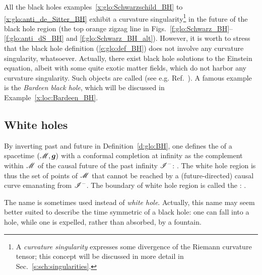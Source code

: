 \begin{remark}
All the black holes examples~\ref{x:glo:Schwarzschild_BH} to \ref{x:glo:anti_de_Sitter_BH} exhibit a curvature singularity\footnote{A \emph{curvature singularity} expresses some divergence of the Riemann curvature tensor; this concept will be discussed in more detail in Sec.~\ref{s:sch:singularities}.} in the future of the black hole region (the top orange zigzag line in
Figs.~\ref{f:glo:Schwarz_BH}--\ref{f:glo:anti_dS_BH} and \ref{f:glo:Schwarz_BH_alt}).
However, it is worth to stress that the black hole definition (\ref{e:glo:def_BH}) does not involve
any curvature singularity, whatsoever. Actually, there exist black hole solutions to the Einstein equation, albeit with some quite exotic matter fields, which do not harbor any curvature singularity.
Such objects are called  (see e.g. Ref.~\cite{Bambi23}).
A famous example is the \emph{Bardeen black hole}, which will be discussed in
Example~\ref{x:loc:Bardeen_BH}.
\end{remark}

\subsection{White holes}

By inverting past and future in Definition~\ref{d:glo:BH}, one defines
the  of a
spacetime $(\mathscr{M},\bm{g})$ with a conformal completion at infinity as the
complement within $\mathscr{M}$ of the causal future of the past infinity $\mathscr{I}^-$:
\be \label{e:glo:def_white_hole}
     .
\ee
The white hole region is thus the set of points of $\mathscr{M}$
that cannot be reached by a (future-directed) causal curve emanating
from $\mathscr{I}^-$.
The boundary of white hole region is called the
:
\be
     .
\ee

\begin{remark}
The name  is sometimes used
instead of \emph{white hole}. Actually, this name may seem better suited
to describe the time symmetric of a black hole: one can fall into a hole, while
one is expelled, rather than absorbed, by a fountain.
\end{remark}

